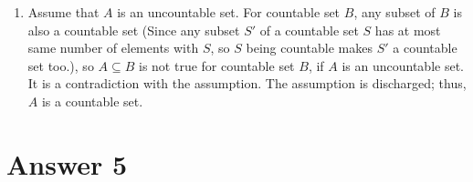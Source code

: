 \documentclass[12pt]{article}
\begin{document}
\begin{enumerate}
   \item Assume that $A$ is an uncountable set. For countable set $B$, any subset of $B$ is also a countable set (Since any subset $S'$ of a countable set $S$ has at most same number of elements with $S$, so $S$ being countable makes $S'$ a countable set too.), so $A \subseteq B$ is not true for countable set $B$, if $A$ is an uncountable set. It is a contradiction with the assumption. The assumption is discharged; thus, $A$ is a countable set.
   
 \end{enumerate}




\section*{Answer 5}
\end{document}
